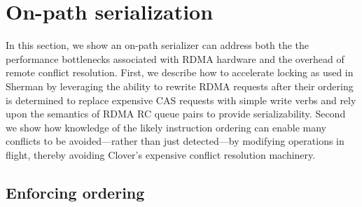 \section{On-path serialization}

In this section, we show an on-path serializer can address both the
the performance bottlenecks associated with RDMA hardware and the
overhead of remote conflict resolution.  First, we describe how to
accelerate locking as used in Sherman by leveraging the ability to
rewrite RDMA requests after their ordering is determined to replace
expensive CAS requests with simple write verbs and rely upon the
semantics of RDMA RC queue pairs to provide serializability.
Second we show how knowledge of the likely instruction ordering can
enable many conflicts to be avoided---rather than just detected---by
modifying operations in flight, thereby avoiding Clover's expensive conflict
resolution machinery.




\subsection{Enforcing ordering}

